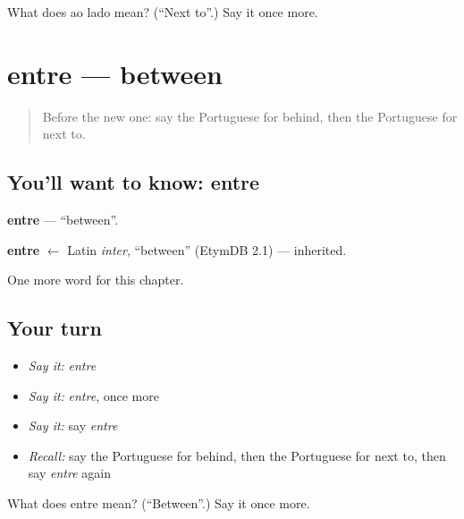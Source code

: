 \begin{tcolorbox}[breakable,colback=teal!4,colframe=teal!35!black,title={Before you move on}]
What does ao lado mean? (\textquotedblleft{}Next to\textquotedblright{}.) Say it once more.
\end{tcolorbox}
\section[entre]{entre — between}

\label{lesson:PT-C89-entre}



\begin{quote}
Before the new one: say the Portuguese for behind, then the Portuguese for next to.
\end{quote}

\subsection*{You'll want to know: entre}
\textbf{entre} — \textquotedblleft{}between\textquotedblright{}.

\begin{cousinweb}
\textbf{entre} $\leftarrow$ Latin \emph{inter}, \textquotedblleft{}between\textquotedblright{} (EtymDB 2.1) — inherited.
\end{cousinweb}

\begin{grammarlens}[title={What you've built}]
One more word for this chapter.
\end{grammarlens}

\subsection*{Your turn}
\begin{itemize}
\raggedright
  \item \emph{Say it:} \emph{entre}
  \item \emph{Say it:} \emph{entre}, once more
  \item \emph{Say it:} say \emph{entre}
  \item \emph{Recall:} say the Portuguese for behind, then the Portuguese for next to, then say \emph{entre} again
\end{itemize}

\begin{tcolorbox}[breakable,colback=teal!4,colframe=teal!35!black,title={Before you move on}]
What does entre mean? (\textquotedblleft{}Between\textquotedblright{}.) Say it once more.
\end{tcolorbox}
